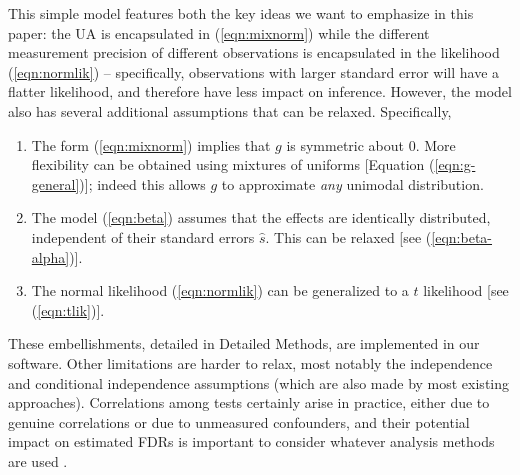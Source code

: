 \documentclass[11pt]{article}
\def\shat{\hat{s}}
\begin{document}
This simple model features both the key ideas we want to emphasize in this paper: the UA is encapsulated in (\ref{eqn:mixnorm}) while
the different measurement precision of different observations is encapsulated in the likelihood (\ref{eqn:normlik}) -- specifically, observations
with larger standard error will have a flatter likelihood, and therefore have less impact on inference.
However, the model also has several additional assumptions that can be relaxed. Specifically,
\begin{enumerate}
\item  The form (\ref{eqn:mixnorm}) implies that $g$ is symmetric about 0.
More flexibility can be obtained using mixtures of uniforms [Equation (\ref{eqn:g-general})]; indeed this 
allows $g$ to approximate {\it any} unimodal distribution. 
\item The model (\ref{eqn:beta}) assumes that the effects are identically distributed, independent of their standard errors $\shat$.
This can be relaxed [see (\ref{eqn:beta-alpha})].
\item The normal likelihood (\ref{eqn:normlik}) can be generalized to a $t$ likelihood [see (\ref{eqn:tlik})].
\end{enumerate}
These embellishments, detailed in Detailed Methods, are implemented in our software.
Other limitations are harder to relax, most notably the independence and conditional independence assumptions
(which are also made by most existing approaches). Correlations among tests certainly arise in practice, either due to genuine correlations 
or due to unmeasured confounders, and their potential impact on estimated FDRs is important to consider
whatever analysis methods are used \cite{efron2007correlation,leek:2007}.
\end{document}
